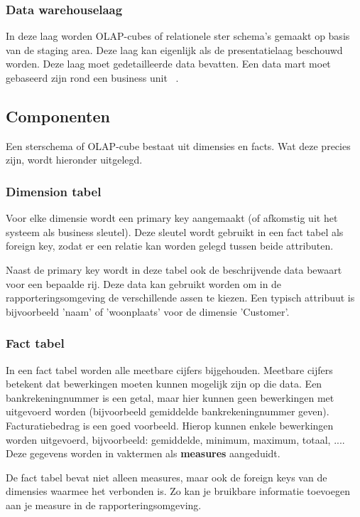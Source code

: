 \pagebreak

\subsubsection{Data warehouselaag}
In deze laag worden OLAP-cubes of relationele ster schema's gemaakt op basis van de staging area. Deze laag kan eigenlijk als de presentatielaag beschouwd worden. Deze laag moet gedetailleerde data bevatten. Een data mart moet gebaseerd zijn rond een business unit ~\autocite{Kimball2013}.

\subsection{Componenten}
Een sterschema of OLAP-cube bestaat uit dimensies en facts. Wat deze precies zijn, wordt hieronder uitgelegd. 

\subsubsection{Dimension tabel}
Voor elke dimensie wordt een primary key aangemaakt (of afkomstig uit het systeem als business sleutel). Deze sleutel wordt gebruikt in een fact tabel als foreign key, zodat er een relatie kan worden gelegd tussen beide attributen.

Naast de primary key wordt in deze tabel ook de beschrijvende data bewaart voor een bepaalde rij. Deze data kan gebruikt worden om in de rapporteringsomgeving de verschillende assen te kiezen. Een typisch attribuut is bijvoorbeeld 'naam' of 'woonplaats' voor de dimensie 'Customer'.

\subsubsection{Fact tabel}
In een fact tabel worden alle meetbare cijfers bijgehouden. Meetbare cijfers betekent dat bewerkingen moeten kunnen mogelijk zijn op die data. Een bankrekeningnummer is een getal, maar hier kunnen geen bewerkingen met uitgevoerd worden (bijvoorbeeld gemiddelde bankrekeningnummer geven). Facturatiebedrag is een goed voorbeeld. Hierop kunnen enkele bewerkingen worden uitgevoerd, bijvoorbeeld: gemiddelde, minimum, maximum, totaal, .... Deze gegevens worden in vaktermen als \textbf{measures} aangeduidt. 

De fact tabel bevat niet alleen measures, maar ook de foreign keys van de dimensies waarmee het verbonden is. Zo kan je bruikbare informatie toevoegen aan je measure in de rapporteringsomgeving.

